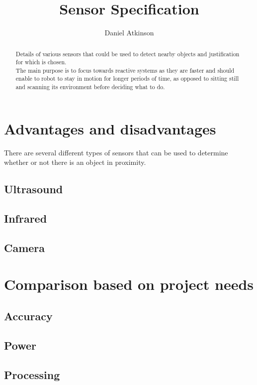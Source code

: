 \documentclass{article}
\begin{document}
\title{Sensor Specification}

\author{Daniel Atkinson}

\maketitle

\begin{abstract}

Details of various sensors that could be used to detect nearby objects and justification for which is chosen.
\\The main purpose is to focus towards reactive systems as they are faster and should enable to robot to stay in motion for longer periods of time, as opposed to sitting still and scanning its environment before deciding what to do.

\end{abstract}


\section{Advantages and disadvantages}
There are several different types of sensors that can be used to determine whether or not there is an object in proximity.

\subsection{Ultrasound}

\subsection{Infrared}

\subsection{Camera}


\section{Comparison based on project needs}

\subsection{Accuracy}

\subsection{Power}

\subsection{Processing}



\end{document}
